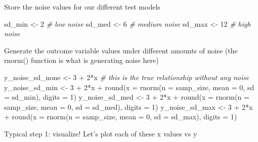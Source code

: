 \documentclass[
]{book}
\newenvironment{Shaded}{\begin{snugshade}}{\end{snugshade}}
\newcommand{\AttributeTok}[1]{\textcolor[rgb]{0.77,0.63,0.00}{#1}}
\newcommand{\CommentTok}[1]{\textcolor[rgb]{0.56,0.35,0.01}{\textit{#1}}}
\newcommand{\DecValTok}[1]{\textcolor[rgb]{0.00,0.00,0.81}{#1}}
\newcommand{\FunctionTok}[1]{\textcolor[rgb]{0.00,0.00,0.00}{#1}}
\newcommand{\NormalTok}[1]{#1}
\newcommand{\OtherTok}[1]{\textcolor[rgb]{0.56,0.35,0.01}{#1}}
\newcommand{\SpecialCharTok}[1]{\textcolor[rgb]{0.00,0.00,0.00}{#1}}
\begin{document}
Store the noise values for our different test models

\begin{Shaded}
\begin{Highlighting}[]
\NormalTok{sd\_min }\OtherTok{\textless{}{-}} \DecValTok{2} \CommentTok{\# low noise}
\NormalTok{sd\_med }\OtherTok{\textless{}{-}} \DecValTok{6} \CommentTok{\# medium noise}
\NormalTok{sd\_max }\OtherTok{\textless{}{-}} \DecValTok{12} \CommentTok{\# high noise}
\end{Highlighting}
\end{Shaded}

Generate the outcome variable values under different amounts of noise (the rnorm() function is what is generating noise here)

\begin{Shaded}
\begin{Highlighting}[]
\NormalTok{y\_noise\_sd\_none }\OtherTok{\textless{}{-}} \DecValTok{3} \SpecialCharTok{+} \DecValTok{2}\SpecialCharTok{*}\NormalTok{x }\CommentTok{\# this is the true relationship without any noise}
\NormalTok{y\_noise\_sd\_min }\OtherTok{\textless{}{-}} \DecValTok{3} \SpecialCharTok{+} \DecValTok{2}\SpecialCharTok{*}\NormalTok{x }\SpecialCharTok{+} \FunctionTok{round}\NormalTok{(}\AttributeTok{x =} \FunctionTok{rnorm}\NormalTok{(}\AttributeTok{n =}\NormalTok{ samp\_size, }\AttributeTok{mean =} \DecValTok{0}\NormalTok{, }\AttributeTok{sd =}\NormalTok{ sd\_min), }\AttributeTok{digits =} \DecValTok{1}\NormalTok{)}
\NormalTok{y\_noise\_sd\_med }\OtherTok{\textless{}{-}} \DecValTok{3} \SpecialCharTok{+} \DecValTok{2}\SpecialCharTok{*}\NormalTok{x }\SpecialCharTok{+} \FunctionTok{round}\NormalTok{(}\AttributeTok{x =} \FunctionTok{rnorm}\NormalTok{(}\AttributeTok{n =}\NormalTok{ samp\_size, }\AttributeTok{mean =} \DecValTok{0}\NormalTok{, }\AttributeTok{sd =}\NormalTok{ sd\_med), }\AttributeTok{digits =} \DecValTok{1}\NormalTok{)}
\NormalTok{y\_noise\_sd\_max }\OtherTok{\textless{}{-}} \DecValTok{3} \SpecialCharTok{+} \DecValTok{2}\SpecialCharTok{*}\NormalTok{x }\SpecialCharTok{+} \FunctionTok{round}\NormalTok{(}\AttributeTok{x =} \FunctionTok{rnorm}\NormalTok{(}\AttributeTok{n =}\NormalTok{ samp\_size, }\AttributeTok{mean =} \DecValTok{0}\NormalTok{, }\AttributeTok{sd =}\NormalTok{ sd\_max), }\AttributeTok{digits =} \DecValTok{1}\NormalTok{)}
\end{Highlighting}
\end{Shaded}

Typical step 1: visualize! Let's plot each of these x values vs y
\end{document}
